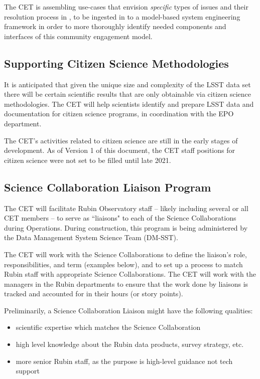 \documentclass[DM,lsstdraft,toc]{lsstdoc}
\begin{document}
The CET is assembling use-cases that envision \textit{specific} types of issues and their resolution process in , to be ingested in to a model-based system engineering framework in order to more thoroughly identify needed components and interfaces of this community engagement model.


\subsection{Supporting Citizen Science Methodologies}\label{ssec:mod_citizen}

It is anticipated that given the unique size and complexity of the LSST data set there will be certain scientific results that are only obtainable via citizen science methodologies.
The CET will help scientists identify and prepare LSST data and documentation for citizen science programs, in coordination with the EPO department. 

The CET's activities related to citizen science are still in the early stages of development.
As of Version 1 of this document, the CET staff positions for citizen science were not set to be filled until late 2021.


\subsection{Science Collaboration Liaison Program}\label{ssec:mod_liaisons}

The CET will facilitate Rubin Observatory staff -- likely including several or all CET members -- to serve as ``liaisons" to each of the Science Collaborations during Operations. 
During construction, this program is being administered by the Data Management System Science Team (DM-SST).

The CET will work with the Science Collaborations to define the liaison's role, responsibilities, and term (examples below), and to set up a process to match Rubin staff with appropriate Science Collaborations.
The CET will work with the managers in the Rubin departments to ensure that the work done by liaisons is tracked and accounted for in their hours (or story points). 

Preliminarily, a Science Collaboration Liaison might have the following qualities:
\begin{itemize}
\item scientific expertise which matches the Science Collaboration
\item high level knowledge about the Rubin data products, survey strategy, etc. 
\item more senior Rubin staff, as the purpose is high-level guidance not tech support
\end{itemize}
\end{document}
